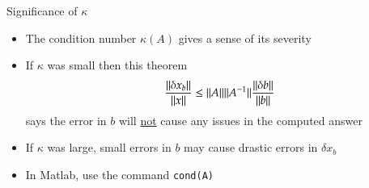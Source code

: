 \documentclass[10pt]{beamer}
\begin{document}
\begin{frame}{Significance of $\kappa$}
    \begin{itemize}
        \item The condition number $\kappa(A)$ gives a sense of its severity 

        \item If $\kappa$ was small then this theorem  
        \begin{equation*}
        \frac{{{\|\delta x_b\|}}}{{{\|x\|}}}
        \le 
        {\ensuremath{{\|A\|}}}{\ensuremath{{\|A^{-1}\|}}}
        \frac{{{\|\delta b\|}}}{{{{\|b\|}}}}
        \end{equation*}
        says the error in $b$ will \underline{not} cause any issues in the computed answer

        \item If $\kappa$ was large, small errors in $b$ may cause drastic errors in $\delta x_b$ 

        \item In Matlab, use the command \texttt{cond(A)}
    \end{itemize}

\end{frame}


\end{document}
